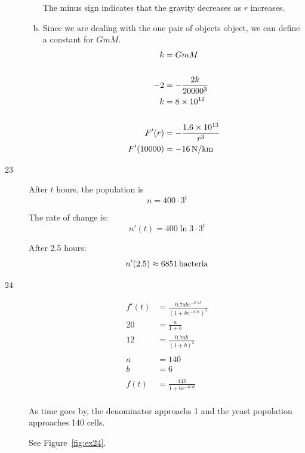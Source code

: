 \documentclass[letterpaper, landscape]{exam}
\begin{document}
\begin{description}
\begin{enumerate}[(a)]
          The minus sign indicates that the gravity decreases as $r$ increases.

        \item Since we are dealing with the one pair of objects object, we can define a constant for $GmM$.
          \begin{align*}
            k         & = G m M \\
            \\
            -2        & = - \frac{2 k}{20000^3} \\
            k         & = 8 \times 10^{12} \\
            \\
            F'(r)     & = - \frac{1.6 \times 10^{13}}{r^3} \\
            F'(10000) & = \unit[-16]{N/km} \\
          \end{align*}

      \end{enumerate}

    \item[23]
      After $t$ hours, the population is 
      \[
        n = 400 \cdot 3^t 
      \]

      The rate of change is:
      \[
        n'(t) = 400 \ln 3 \cdot 3^t
      \]

      After 2.5 hours:
      \[
        n'(2.5) \approx \unit[6851]{bacteria}
      \]

    \item[24]
      \begin{align*}
        f'(t) &= \frac{0.7abe^{ - 0.7 t}}{\left( 1 + be^{ - 0.7 t} \right)^2}
        \\
        20 &= \frac{a}{1 + b} \\
        12 &= \frac{0.7 ab}{\left( 1 + b \right)^2} \\
        \\
        a &= 140 \\
        b &= 6 \\
        \\
        f(t) &= \frac{140}{1 + 6 e^{-0.7t}} \\
      \end{align*}

      As time goes by, the denominator approachs 1 and the yeast population approaches 140 cells. 
      
      See Figure~\ref{fig:ex24}.


\end{description}
\end{document}
